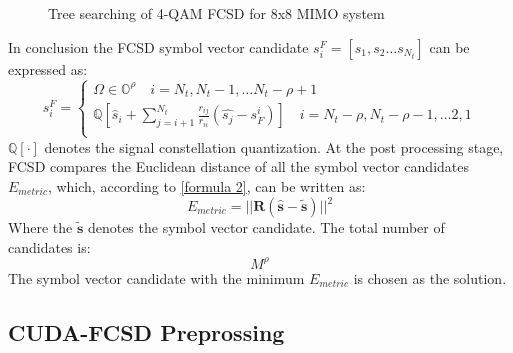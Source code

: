 \documentclass[12pt,a4paper,final]{article}
\begin{document}
\begin{spacing}{2.5}
\begin{figure}[htb]
\caption{Tree searching of 4-QAM FCSD for 8x8 MIMO system}
\label{figure4}
\end{figure}
In conclusion the FCSD symbol vector candidate $s^{F}_{i}=[s_{1},s_{2}\dots s_{N_{t}}]$ can be expressed as:
\begin{displaymath}
s^{F}_{i}=\left\lbrace\begin{array}{c}
\Omega\in  \mathbb{O}^{\rho}      \quad i=N_{t},N_{t}-1,\dots N_{t}-\rho+1\\
\mathbb{Q}[\hat{s}_{i}+\sum_{j=i+1}^{N_{t}}\frac{r_{ij}}{r_{ii}}(\hat{s_{j}}-s_{F}^{i})] \quad i=N_{t}-\rho,N_{t}-\rho-1,\dots 2,1 \\
\end{array}\right.
\end{displaymath}
$\mathbb{Q}[\cdot]$ denotes the signal constellation quantization. At the post processing stage, FCSD compares the Euclidean distance of all the symbol vector candidates $E_{metric}$, which, according to \ref{formula 2}, can be written as:
\begin{equation}
E_{metric}=||\mathbf{R}(\mathbf{\hat{s}}-\mathbf{\widetilde{s}})||^{2}
\end{equation} 
Where the $\mathbf{\widetilde{s}}$ denotes the symbol vector candidate. The total number of candidates is: 
\begin{equation}
M^{\rho}     \label{path number}
\end{equation} 
The symbol vector candidate with the minimum $E_{metric}$ is chosen as the solution.
\subsection{CUDA-FCSD Preprossing}

\end{spacing}
\end{document}
